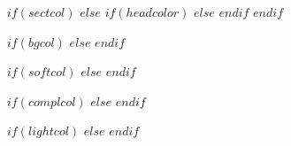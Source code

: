 \usepackage{color}
\usepackage{xcolor}

$if(sectcol)$
$else$
$if(headcolor)$
$else$
$endif$
$endif$

$if(bgcol)$
$else$
$endif$

$if(softcol)$
$else$
$endif$

$if(complcol)$
$else$
$endif$

%
$if(lightcol)$
$else$
$endif$


\newcommand{\tzlarrow}{(0,0) -- (0.2,0) -- (0.3,0.2) -- (0.2,0.4) -- (0,0.4) -- (0.1,0.2) -- cycle;}
\newcommand{\larrow}[1]{%
  \begin{tikzpicture}[scale=0.58]
    \filldraw[fill=#1!100,draw=#1!100!black] \tzlarrow
  \end{tikzpicture}}

